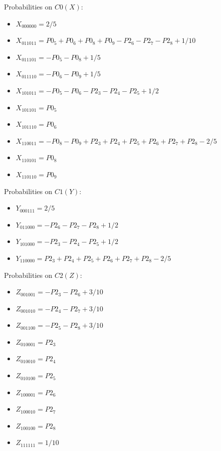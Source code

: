 \documentclass[11pt]{article}
\begin{document}
Probabilities on $C0 (X)$:
\begin{itemize}
    \item $X_{000000} = 2/5$
    \item $X_{011011} = P0_5 + P0_6 + P0_8 + P0_9 - P2_6 - P2_7 - P2_8 + 1/10$
    \item $X_{011101} = -P0_5 - P0_8 + 1/5$
    \item $X_{011110} = -P0_6 - P0_9 + 1/5$
    \item $X_{101011} = -P0_5 - P0_6 - P2_3 - P2_4 - P2_5 + 1/2$
    \item $X_{101101} = P0_5$
    \item $X_{101110} = P0_6$
    \item $X_{110011} = -P0_8 - P0_9 + P2_3 + P2_4 + P2_5 + P2_6 + P2_7 + P2_8 - 2/5$
    \item $X_{110101} = P0_8$
    \item $X_{110110} = P0_9$
\end{itemize}

Probabilities on $C1 (Y)$:
\begin{itemize}
    \item $Y_{000111} = 2/5$
    \item $Y_{011000} = -P2_6 - P2_7 - P2_8 + 1/2$
    \item $Y_{101000} = -P2_3 - P2_4 - P2_5 + 1/2$
    \item $Y_{110000} = P2_3 + P2_4 + P2_5 + P2_6 + P2_7 + P2_8 - 2/5$
\end{itemize}

Probabilities on $C2 (Z)$:
\begin{itemize}
    \item $Z_{001001} = -P2_3 - P2_6 + 3/10$
    \item $Z_{001010} = -P2_4 - P2_7 + 3/10$
    \item $Z_{001100} = -P2_5 - P2_8 + 3/10$
    \item $Z_{010001} = P2_3$
    \item $Z_{010010} = P2_4$
    \item $Z_{010100} = P2_5$
    \item $Z_{100001} = P2_6$
    \item $Z_{100010} = P2_7$
    \item $Z_{100100} = P2_8$
    \item $Z_{111111} = 1/10$
\end{itemize}
\end{document}
